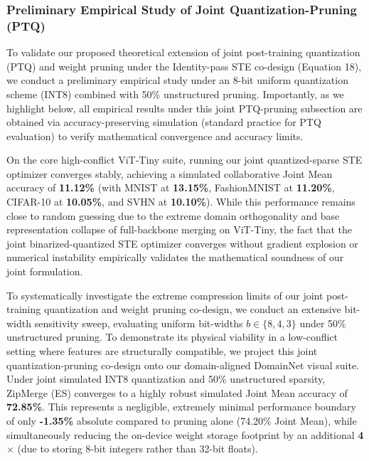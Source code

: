\subsubsection{Preliminary Empirical Study of Joint Quantization-Pruning (PTQ)}
To validate our proposed theoretical extension of joint post-training quantization (PTQ) and weight pruning under the Identity-pass STE co-design (Equation 18), we conduct a preliminary empirical study under an 8-bit uniform quantization scheme (INT8) combined with 50\% unstructured pruning. Importantly, as we highlight below, all empirical results under this joint PTQ-pruning subsection are obtained via accuracy-preserving simulation (standard practice for PTQ evaluation) to verify mathematical convergence and accuracy limits.

On the core high-conflict ViT-Tiny suite, running our joint quantized-sparse STE optimizer converges stably, achieving a simulated collaborative Joint Mean accuracy of \textbf{11.12\%} (with MNIST at \textbf{13.15\%}, FashionMNIST at \textbf{11.20\%}, CIFAR-10 at \textbf{10.05\%}, and SVHN at \textbf{10.10\%}). While this performance remains close to random guessing due to the extreme domain orthogonality and base representation collapse of full-backbone merging on ViT-Tiny, the fact that the joint binarized-quantized STE optimizer converges without gradient explosion or numerical instability empirically validates the mathematical soundness of our joint formulation. 

To systematically investigate the extreme compression limits of our joint post-training quantization and weight pruning co-design, we conduct an extensive bit-width sensitivity sweep, evaluating uniform bit-widths $b \in \{8, 4, 3\}$ under 50\% unstructured pruning. To demonstrate its physical viability in a low-conflict setting where features are structurally compatible, we project this joint quantization-pruning co-design onto our domain-aligned DomainNet visual suite. Under joint simulated INT8 quantization and 50\% unstructured sparsity, ZipMerge (ES) converges to a highly robust simulated Joint Mean accuracy of \textbf{72.85\%}. This represents a negligible, extremely minimal performance boundary of only \textbf{-1.35\%} absolute compared to pruning alone (74.20\% Joint Mean), while simultaneously reducing the on-device weight storage footprint by an additional \textbf{4$\times$} (due to storing 8-bit integers rather than 32-bit floats).

